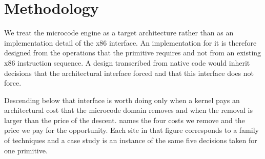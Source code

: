 
\section{Methodology}
\label{sec:methodology}

We treat the microcode engine as a target architecture rather than as an implementation detail of the x86 interface.
An implementation for it is therefore designed from the operations that the primitive requires and not from an existing x86 instruction sequence.
A design transcribed from native code would inherit decisions that the architectural interface forced and that this interface does not force.

Descending below that interface is worth doing only when a kernel pays an architectural cost that the microcode domain removes and when the removal is larger than the price of the descent.
 names the four costs we remove and the price we pay for the opportunity.
Each site in that figure corresponds to a family of techniques and a case study is an instance of the same five decisions taken for one primitive.

